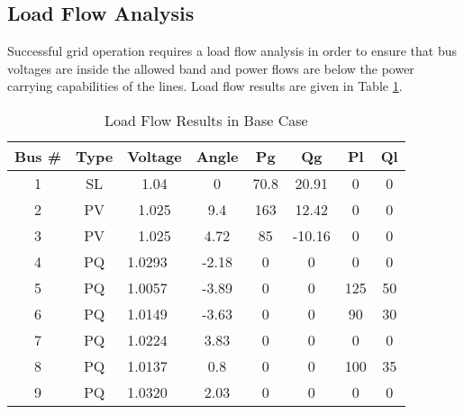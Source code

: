 \subsection{Load Flow Analysis}
Successful grid operation requires a load flow analysis in order to ensure that bus voltages are inside the allowed band and power flows are below the power carrying capabilities of the lines. Load flow results are given in Table \ref{loadflow}.
\begin{table}[h!]
	\centering
	\begin{tabular}{cclccccc}
		\hline
		\textbf{Bus \#} & \textbf{Type} & \multicolumn{1}{c}{\textbf{Voltage}} & \textbf{Angle} & \textbf{Pg} & \textbf{Qg} & \textbf{Pl} & \textbf{Ql} \\ \hline
		1               & SL            & \multicolumn{1}{c}{1.04}             & 0              & 70.8        & 20.91       & 0           & 0           \\
		2               & PV            & \multicolumn{1}{c}{1.025}            & 9.4            & 163         & 12.42       & 0           & 0           \\
		3               & PV            & \multicolumn{1}{c}{1.025}            & 4.72           & 85          & -10.16      & 0           & 0           \\
		4               & PQ            & 1.0293                               & -2.18          & 0           & 0           & 0           & 0           \\
		5               & PQ            & 1.0057                               & -3.89          & 0           & 0           & 125         & 50          \\
		6               & PQ            & 1.0149                               & -3.63          & 0           & 0           & 90          & 30          \\
		7               & PQ            & 1.0224                               & 3.83           & 0           & 0           & 0           & 0           \\
		8               & PQ            & 1.0137                               & 0.8            & 0           & 0           & 100         & 35          \\
		9               & PQ            & 1.0320                               & 2.03           & 0           & 0           & 0           & 0           \\ \hline
	\end{tabular}
	\caption{Load Flow Results in Base Case}
	\label{loadflow}
\end{table}